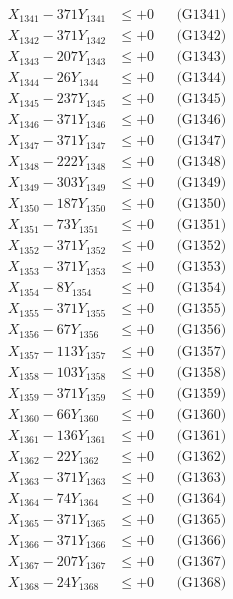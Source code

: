 \documentclass[a4paper,10pt]{article}
\begin{document}
{\begin{align}
\allowbreak
X_{1341} - 371Y_{1341} &\leq +0 && \text{(G1341)} \\
X_{1342} - 371Y_{1342} &\leq +0 && \text{(G1342)} \\
X_{1343} - 207Y_{1343} &\leq +0 && \text{(G1343)} \\
X_{1344} - 26Y_{1344} &\leq +0 && \text{(G1344)} \\
X_{1345} - 237Y_{1345} &\leq +0 && \text{(G1345)} \\
X_{1346} - 371Y_{1346} &\leq +0 && \text{(G1346)} \\
X_{1347} - 371Y_{1347} &\leq +0 && \text{(G1347)} \\
X_{1348} - 222Y_{1348} &\leq +0 && \text{(G1348)} \\
X_{1349} - 303Y_{1349} &\leq +0 && \text{(G1349)} \\
X_{1350} - 187Y_{1350} &\leq +0 && \text{(G1350)} \\
\allowbreak
X_{1351} - 73Y_{1351} &\leq +0 && \text{(G1351)} \\
X_{1352} - 371Y_{1352} &\leq +0 && \text{(G1352)} \\
X_{1353} - 371Y_{1353} &\leq +0 && \text{(G1353)} \\
X_{1354} - 8Y_{1354} &\leq +0 && \text{(G1354)} \\
X_{1355} - 371Y_{1355} &\leq +0 && \text{(G1355)} \\
X_{1356} - 67Y_{1356} &\leq +0 && \text{(G1356)} \\
X_{1357} - 113Y_{1357} &\leq +0 && \text{(G1357)} \\
X_{1358} - 103Y_{1358} &\leq +0 && \text{(G1358)} \\
X_{1359} - 371Y_{1359} &\leq +0 && \text{(G1359)} \\
X_{1360} - 66Y_{1360} &\leq +0 && \text{(G1360)} \\
\allowbreak
X_{1361} - 136Y_{1361} &\leq +0 && \text{(G1361)} \\
X_{1362} - 22Y_{1362} &\leq +0 && \text{(G1362)} \\
X_{1363} - 371Y_{1363} &\leq +0 && \text{(G1363)} \\
X_{1364} - 74Y_{1364} &\leq +0 && \text{(G1364)} \\
X_{1365} - 371Y_{1365} &\leq +0 && \text{(G1365)} \\
X_{1366} - 371Y_{1366} &\leq +0 && \text{(G1366)} \\
X_{1367} - 207Y_{1367} &\leq +0 && \text{(G1367)} \\
X_{1368} - 24Y_{1368} &\leq +0 && \text{(G1368)} \\

\end{align}}
\end{document}
